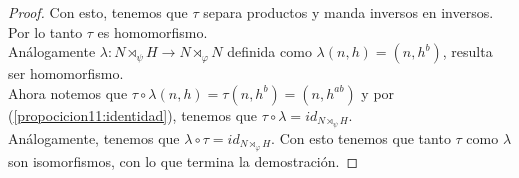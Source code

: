 \begin{proof}
    Con esto, tenemos que $\tau$ separa productos y manda inversos en inversos. Por lo tanto $\tau$ es
    homomorfismo. \\
    
    Análogamente $\lambda : N \rtimes_\psi H \rightarrow N \rtimes_\varphi N$
    definida como $\lambda(n,h) = (n, h^b)$, resulta ser homomorfismo.\\
        
    Ahora notemos que $\tau \circ \lambda(n,h) = \tau(n, h^b) = (n, h^{ab})$ y por 
    (\ref{propocicion11:identidad}), tenemos que $\tau \circ \lambda = id_{N \rtimes_\psi H}$.\\
    
    Análogamente, tenemos que $\lambda \circ \tau = id_{N \rtimes_\varphi H}$. Con esto tenemos que
    tanto $\tau$ como $\lambda$ son isomorfismos, con lo que termina la demostración. 
\end{proof}